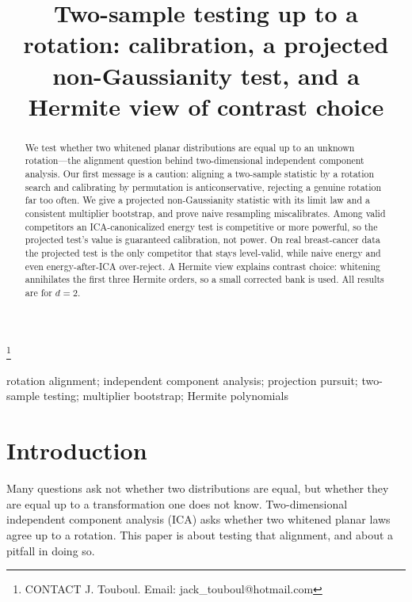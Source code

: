 \documentclass[]{interact}
\theoremstyle{plain}
\theoremstyle{remark}
\begin{document}

\title{Two-sample testing up to a rotation: calibration, a projected
non-Gaussianity test, and a Hermite view of contrast choice}

\author{}

\thanks{CONTACT J. Touboul. Email: jack\_touboul@hotmail.com}

\maketitle

\begin{abstract}
We test whether two whitened planar distributions are equal up to an unknown
rotation---the alignment question behind two-dimensional independent component
analysis. Our first message is a caution: aligning a two-sample statistic by a
rotation search and calibrating by permutation is anticonservative, rejecting a
genuine rotation far too often. We give a projected non-Gaussianity statistic with
its limit law and a consistent multiplier bootstrap, and prove naive resampling
miscalibrates. Among valid competitors an ICA-canonicalized energy test is
competitive or more powerful, so the projected test's value is guaranteed
calibration, not power. On real breast-cancer data the projected test is the only
competitor that stays level-valid, while naive energy and even energy-after-ICA
over-reject. A Hermite view explains contrast choice: whitening annihilates the
first three Hermite orders, so a small corrected bank is used. All results are for
$d=2$.
\end{abstract}

\begin{keywords}
rotation alignment; independent component analysis; projection pursuit; two-sample
testing; multiplier bootstrap; Hermite polynomials
\end{keywords}

\section{Introduction}

Many questions ask not whether two distributions are equal, but whether they are
equal up to a transformation one does not know. Two-dimensional independent
component analysis (ICA) asks whether two whitened planar laws agree up to a
rotation. This paper is about testing that alignment, and about a pitfall in doing
so.
\end{document}
